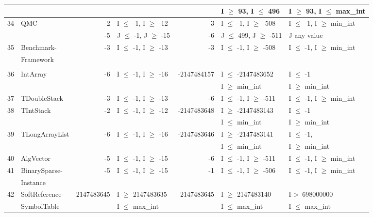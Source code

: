 {\begin{longtable}{|l|l|r|l|r|l|l|}
	&                                             &				& 							&				& I $\ge$ 93, I $\le$ 496			& I $\ge$ 93, 	I $\le$ max\_int	\\\hline
34	& QMC						&-2 			& I $\le$ -1, I $\ge$ -12		&-3 			& I $\le$ -1, I $\ge$ -508			& I $\le$ -1, I $\ge$ min\_int	\\ 
	&                                             &-5 			& J $\le$ -1, J $\ge$ -15		&-6 			& J $\le$ 499, J $\ge$ -511		& J any value			 		  	\\\hline
35	& Benchmark-				&-3 			& I $\le$ -1, I $\ge$ -13		&-3 			& I $\le$ -1, I $\ge$ -508			& I $\le$ -1, I $\ge$ min\_int	\\ 
	&Framework					&				&							&				&								&						\\\hline
	&							&				&							&				&								&  						\\\hline
36	& IntArray					&-6 			& I $\le$ -1, I $\ge$ -16		& -2147484157	& I $\le$ -2147483652			& I $\le$ -1								\\ 
	&							&				&							&				& I $\ge$ min\_int				& I $\ge$ min\_int				\\\hline	
37	& TDoubleStack				&-3 			& I $\le$ -1, I $\ge$ -13		&-6 			& I $\le$ -1, I $\ge$ -511			& I $\le$ -1, I $\ge$ min\_int	\\ \hline
38	& TIntStack					&-2 			& I $\le$ -1, I $\ge$ -12		&-2147483648	& I $\ge$ -2147483143			& I $\le$ -1 							\\ 
	&							&				&							&				& I $\le$ min\_int				& I $\ge$ min\_int				\\\hline
39	& TLongArrayList				&-6 			& I $\le$ -1, I $\ge$ -16		&-2147483646	& I $\ge$ -2147483141 			& I $\le$ -1, 							\\ 
	&							&				&							&				& I $\le$ min\_int				& I $\ge$ min\_int				\\\hline
40	& AlgVector					&-5 			& I $\le$ -1, I $\ge$ -15		&-6 			& I $\le$ -1, I $\ge$ -511			& I $\le$ -1, I $\ge$ min\_int	\\ \hline
41	& BinarySparse-				&-5 			& I $\le$ -1, I $\ge$ -15		&-1 			& I $\le$ -1, I $\ge$ -506			& I $\le$ -1, I $\ge$ min\_int	\\ 
	& Instance					&				&							&				&								&		\\\hline
42	& SoftReference-				&2147483645	& I $\ge$ 2147483635		&~2147483645	& I $\ge$ 2147483140			& I \textgreater~698000000\\ 
	& SymbolTable                        &				& I $\le$ max\_int			&				& I $\le$ max\_int				& I $\le$ max\_int	\\\hline	

\end{longtable}}
